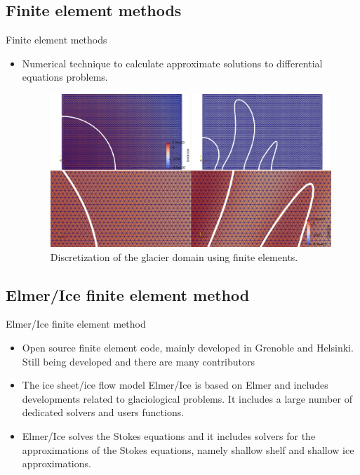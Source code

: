 \documentclass[11pt]{beamer}
\begin{document}
	\subsection{Finite element methods}
		\begin{frame}{Finite element methods}
		
		\begin{itemize} 
			\justifying
			\item Numerical technique to calculate approximate solutions to differential equations problems.
			\begin{figure}
				\centering
				\includegraphics[scale=0.2]{../fig/grid_and_bedrock.png}
				\caption{Discretization of the glacier domain using finite elements.}
				\label{FEM}
			\end{figure}
		\end{itemize}
		\end{frame}
	\subsection{Elmer/Ice finite element method}
	\begin{frame}{Elmer/Ice finite element method}
		
		\begin{itemize}
			\justifying
			\item Open source finite element code, mainly developed in Grenoble and Helsinki. Still being developed and there are many contributors
			\pause \item The ice sheet/ice flow model Elmer/Ice is based on Elmer and includes developments related to glaciological problems. It includes a large number of dedicated solvers and users functions.
			\pause \item Elmer/Ice solves the Stokes equations and it includes solvers for the approximations of the Stokes equations, namely shallow shelf and shallow ice approximations.
		\end{itemize}
	\end{frame}
\end{document}
